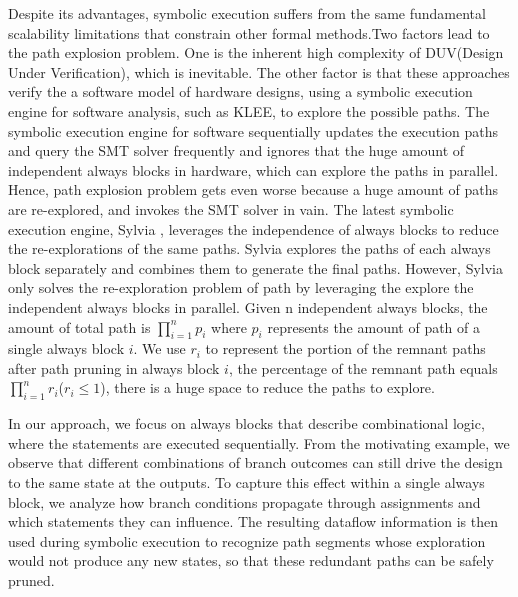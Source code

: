 \documentclass[conference]{IEEEtran}
\begin{document}
 Despite its advantages, symbolic execution suffers from the same fundamental scalability limitations that constrain other formal methods.Two factors lead to the path explosion problem. One is the inherent high complexity of DUV(Design Under Verification), which is inevitable. The other factor is that these approaches verify the a software model of hardware designs, using a symbolic execution engine for software analysis, such as KLEE, to explore the possible paths. The symbolic execution engine for software sequentially updates the execution paths and query the SMT solver frequently and ignores that the huge amount of independent always blocks in hardware, which can explore the paths in parallel. Hence, path explosion problem gets even worse because a huge amount of paths are re-explored, and invokes  the SMT solver in vain. The latest symbolic execution engine, Sylvia \cite{Ryan2023Sylvia}, leverages the independence of always blocks to reduce the re-explorations of the same paths. Sylvia explores the paths of each always block separately and combines them to generate the final paths. However, Sylvia only solves the re-exploration problem of path by leveraging the explore the independent always blocks in parallel. Given n independent always blocks, the amount of total path is $\prod_{i=1}^{n} p_i $ where $p_i$ represents the amount of path of a single always block $i$. We use $r_i$ to represent the portion of the remnant paths after path pruning in always block $i$, the percentage of the remnant path equals $\prod_{i=1}^{n} r_i$($r_i \leq  1$), there is a huge space to reduce the paths to explore.

In our approach, we focus on always blocks that describe combinational logic, where the statements are executed sequentially. From the motivating example, we observe that different combinations of branch outcomes can still drive the design to the same state at the outputs. To capture this effect within a single always block, we analyze how branch conditions propagate through assignments and which statements they can influence. The resulting dataflow information is then used during symbolic execution to recognize path segments whose exploration would not produce any new states, so that these redundant paths can be safely pruned.
\end{document}
